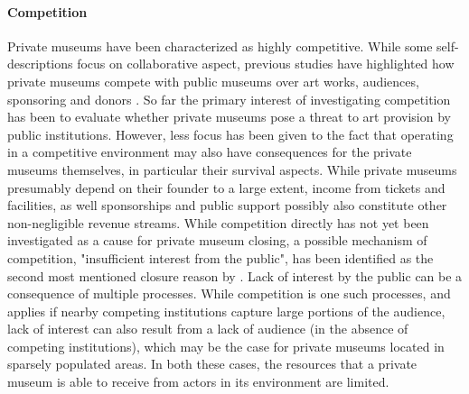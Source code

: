 \documentclass[12pt]{article}
\begin{document}
\paragraph*{Competition}




Private museums have been characterized as highly competitive.
While some self-descriptions focus on collaborative aspect, previous studies have highlighted how private museums compete with public museums over art works, audiences, sponsoring and donors \parencite[p.4]{Kolbe_etal_2022_privatemuseum}. 
So far the primary interest of investigating competition has been to evaluate whether private museums pose a threat to art provision by public institutions.
However, less focus has been given to the fact that operating in a competitive environment may also have consequences for the private museums themselves, in particular their survival aspects.
While private museums presumably depend on their founder to a large extent, income from tickets and facilities, as well sponsorships and public support possibly also constitute other non-negligible revenue streams.
While competition directly has not yet been investigated as a cause for private museum closing, a possible mechanism of competition, "insufficient interest from the public", has been identified as the second most mentioned closure reason by \textcite[p.6]{Velthuis_Gera_2024_fragility}. 
Lack of interest by the public can be a consequence of multiple processes.
While competition is one such processes, and applies if nearby competing institutions capture large portions of the audience, lack of interest can also result from a lack of audience (in the absence of competing institutions), which may be the case for private museums located in sparsely populated areas.
In both these cases, the resources that a private museum is able to receive from actors in its environment are limited. 
\end{document}
